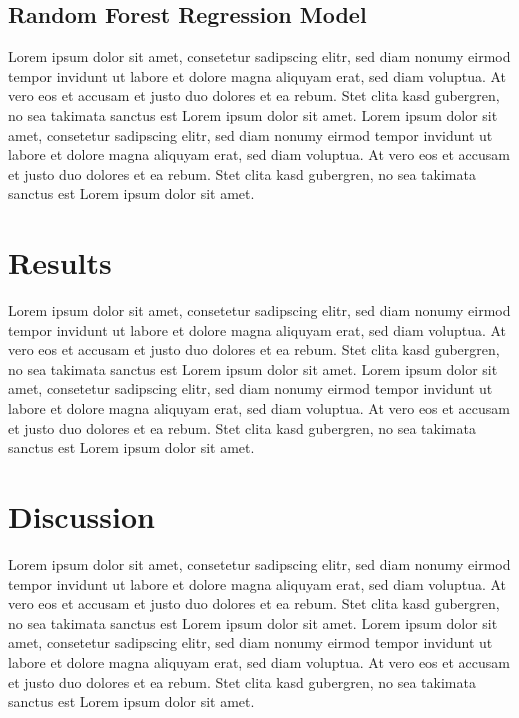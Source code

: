 \documentclass[a4paper, nobind]{templates/ociamthesis}
\begin{document}
\hypertarget{tbd2}{%
\section{Random Forest Regression Model}\label{tbd2}}

Lorem ipsum dolor sit amet, consetetur sadipscing elitr, sed diam nonumy eirmod tempor invidunt ut labore et dolore magna aliquyam erat, sed diam voluptua. At vero eos et accusam et justo duo dolores et ea rebum. Stet clita kasd gubergren, no sea takimata sanctus est Lorem ipsum dolor sit amet. Lorem ipsum dolor sit amet, consetetur sadipscing elitr, sed diam nonumy eirmod tempor invidunt ut labore et dolore magna aliquyam erat, sed diam voluptua. At vero eos et accusam et justo duo dolores et ea rebum. Stet clita kasd gubergren, no sea takimata sanctus est Lorem ipsum dolor sit amet.

\hypertarget{results}{%
\chapter{Results}\label{results}}

Lorem ipsum dolor sit amet, consetetur sadipscing elitr, sed diam nonumy eirmod tempor invidunt ut labore et dolore magna aliquyam erat, sed diam voluptua. At vero eos et accusam et justo duo dolores et ea rebum. Stet clita kasd gubergren, no sea takimata sanctus est Lorem ipsum dolor sit amet. Lorem ipsum dolor sit amet, consetetur sadipscing elitr, sed diam nonumy eirmod tempor invidunt ut labore et dolore magna aliquyam erat, sed diam voluptua. At vero eos et accusam et justo duo dolores et ea rebum. Stet clita kasd gubergren, no sea takimata sanctus est Lorem ipsum dolor sit amet.

\hypertarget{discussion}{%
\chapter{Discussion}\label{discussion}}

Lorem ipsum dolor sit amet, consetetur sadipscing elitr, sed diam nonumy eirmod tempor invidunt ut labore et dolore magna aliquyam erat, sed diam voluptua. At vero eos et accusam et justo duo dolores et ea rebum. Stet clita kasd gubergren, no sea takimata sanctus est Lorem ipsum dolor sit amet. Lorem ipsum dolor sit amet, consetetur sadipscing elitr, sed diam nonumy eirmod tempor invidunt ut labore et dolore magna aliquyam erat, sed diam voluptua. At vero eos et accusam et justo duo dolores et ea rebum. Stet clita kasd gubergren, no sea takimata sanctus est Lorem ipsum dolor sit amet.
\end{document}
